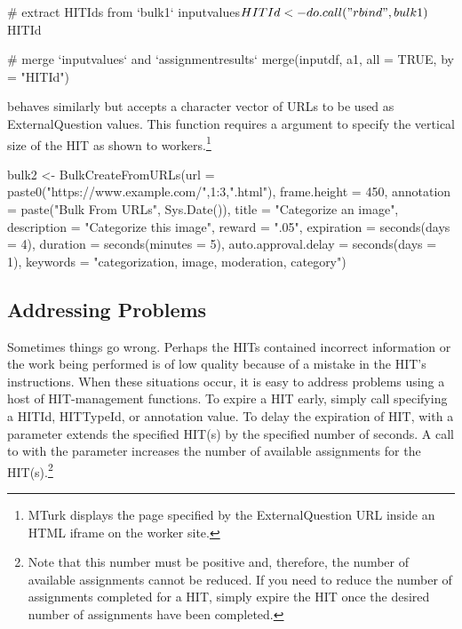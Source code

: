 \begin{example}
# extract HITIds from `bulk1`
inputvalues$HITId <- do.call("rbind", bulk1)$HITId

# merge `inputvalues` and `assignmentresults`
merge(inputdf, a1, all = TRUE, by = "HITId")
\end{example}

 behaves similarly but accepts a character vector of URLs to be used as ExternalQuestion values. This function requires a  argument to specify the vertical size of the HIT as shown to workers.\footnote{MTurk displays the page specified by the ExternalQuestion URL inside an HTML iframe on the worker site.}


\begin{example}
bulk2 <- 
BulkCreateFromURLs(url = paste0("https://www.example.com/",1:3,".html"),
                   frame.height = 450,
                   annotation = paste("Bulk From URLs", Sys.Date()),
                   title = "Categorize an image",
                   description = "Categorize this image",
                   reward = ".05",
                   expiration = seconds(days = 4),
                   duration = seconds(minutes = 5),
                   auto.approval.delay = seconds(days = 1),
                   keywords = "categorization, image, moderation, category")
\end{example}



\subsection{Addressing Problems}

Sometimes things go wrong. Perhaps the HITs contained incorrect information or the work being performed is of low quality because of a mistake in the HIT's instructions. When these situations occur, it is easy to address problems using a host of HIT-management functions. To expire a HIT early, simply call  specifying a HITId, HITTypeId, or annotation value. To delay the expiration of HIT,  with a  parameter extends the specified HIT(s) by the specified number of seconds. A call to  with the  parameter increases the number of available assignments for the HIT(s).\footnote{Note that this number must be positive and, therefore, the number of available assignments cannot be reduced. If you need to reduce the number of assignments completed for a HIT, simply expire the HIT once the desired number of assignments have been completed.}

